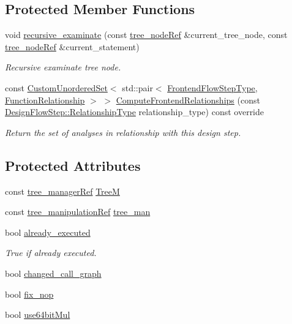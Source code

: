 \subsection*{Protected Member Functions}
\begin{DoxyCompactItemize}
\item 
void \hyperlink{classhls__div__cg__ext_a9c9f6aebf0e63e7997a0258bfc98213a}{recursive\+\_\+examinate} (const \hyperlink{tree__node_8hpp_a6ee377554d1c4871ad66a337eaa67fd5}{tree\+\_\+node\+Ref} \&current\+\_\+tree\+\_\+node, const \hyperlink{tree__node_8hpp_a6ee377554d1c4871ad66a337eaa67fd5}{tree\+\_\+node\+Ref} \&current\+\_\+statement)
\begin{DoxyCompactList}\small\item\em Recursive examinate tree node. \end{DoxyCompactList}\item 
const \hyperlink{classCustomUnorderedSet}{Custom\+Unordered\+Set}$<$ std\+::pair$<$ \hyperlink{frontend__flow__step_8hpp_afeb3716c693d2b2e4ed3e6d04c3b63bb}{Frontend\+Flow\+Step\+Type}, \hyperlink{classFrontendFlowStep_af7cf30f2023e5b99e637dc2058289ab0}{Function\+Relationship} $>$ $>$ \hyperlink{classhls__div__cg__ext_a43c44d4fcf081c7084e6112bea0e68bc}{Compute\+Frontend\+Relationships} (const \hyperlink{classDesignFlowStep_a723a3baf19ff2ceb77bc13e099d0b1b7}{Design\+Flow\+Step\+::\+Relationship\+Type} relationship\+\_\+type) const override
\begin{DoxyCompactList}\small\item\em Return the set of analyses in relationship with this design step. \end{DoxyCompactList}\end{DoxyCompactItemize}
\subsection*{Protected Attributes}
\begin{DoxyCompactItemize}
\item 
const \hyperlink{tree__manager_8hpp_a96ff150c071ce11a9a7a1e40590f205e}{tree\+\_\+manager\+Ref} \hyperlink{classhls__div__cg__ext_a677d64ea74f1d936612ff1de36786ed6}{TreeM}
\item 
const \hyperlink{tree__manipulation_8hpp_a1a9460e3a2f9fc6a96cfd2f24cc9b2a5}{tree\+\_\+manipulation\+Ref} \hyperlink{classhls__div__cg__ext_a323afb4153ecbeaf3f1808824702e815}{tree\+\_\+man}
\item 
bool \hyperlink{classhls__div__cg__ext_aed46d7fb813f564018018ead742012fd}{already\+\_\+executed}
\begin{DoxyCompactList}\small\item\em True if already executed. \end{DoxyCompactList}\item 
bool \hyperlink{classhls__div__cg__ext_a1e647b82d330ae037ab097f99487598f}{changed\+\_\+call\+\_\+graph}
\item 
bool \hyperlink{classhls__div__cg__ext_a820f01674be00cafce2706348a0c7bcd}{fix\+\_\+nop}
\item 
bool \hyperlink{classhls__div__cg__ext_a5082c6a12744c4720f759f163a00e1be}{use64bit\+Mul}
\end{DoxyCompactItemize}
